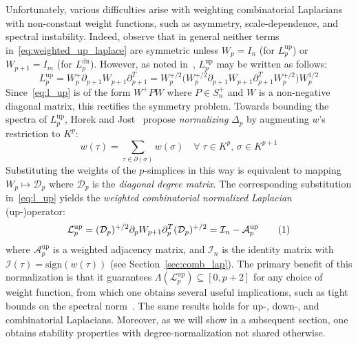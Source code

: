 \documentclass[10pt]{article}
\numberwithin{equation}{section}
\newcommand{\+}{%
	\raisebox{0.18ex}{\scaleobj{0.55}{+}}
}
\theoremstyle{definition}
\theoremstyle{definition}
\newcommand\numberthis{\addtocounter{equation}{1}\tag{\theequation}}
\begin{document}
Unfortunately, various difficulties arise with weighting combinatorial Laplacians with non-constant weight functions, such as asymmetry, scale-dependence, and spectral instability.
Indeed, observe that in general neither terms in~\eqref{eq:weighted_up_laplace} are symmetric unless $W_p = I_n$ (for $L_p^{\text{up}}$) or $W_{p+1} = I_m$ (for $L_p^{\text{dn}}$). 
However, as noted in~\cite{memoli2022persistent}, $L_p^{\text{up}}$ may be written as follows: 
\begin{equation}\label{eq:l_up}
	L_p^{\text{up}} = W_p^{+} \partial_{p+1} W_{p+1} \partial_{p+1}^T  = W_p^{+/2} \big( W_p^{+/2}  \partial_{p+1} W_{p+1} \partial_{p+1}^T W_p^{+/2}  \big ) W_p^{1/2} 
\end{equation}
Since~\eqref{eq:l_up} is of the form $W^{+} P W$ where $P \in S_n^+$ and $W$ is a non-negative diagonal matrix, this rectifies the symmetry problem.
Towards bounding the spectra of $L_p^{\text{up}}$, Horek and Jost~\cite{} propose \emph{normalizing} $\Delta_p$ by augmenting $w$'s restriction to $K^p$: 
\begin{equation}
	w(\tau) = \sum\limits_{\tau \in \partial(\sigma) }w(\sigma) \quad \forall \; \tau \in K^{p}, \, \sigma \in K^{p+1}
\end{equation}
Substituting the weights of the $p$-simplices in this way is equivalent to mapping $W_p \mapsto \mathcal{D}_p$ where $\mathcal{D}_p$ is the \emph{diagonal degree matrix}. The corresponding substitution in~\eqref{eq:l_up} yields the \emph{weighted combinatorial normalized Laplacian} (up-)operator:
\begin{align*}\label{eq:normalized_up_lap}
	 \mathcal{L}_p^{\text{up}} = (\mathcal{D}_p)^{+/2} \partial_p W_{p+1} \partial_p^T (\mathcal{D}_p)^{+/2} = \mathcal{I}_n - \mathcal{A}_p^{\text{up}} \numberthis
\end{align*}
where $\mathcal{A}_p^{\text{up}}$ is a weighted adjacency matrix, and $\mathcal{I}_n$ is the identity matrix with $\mathcal{I}(\tau) = \mathrm{sign}(w(\tau))$ (see Section~\ref{sec:comb_lap}). The primary benefit of this normalization is that it guarantees $\Lambda( \mathcal{L}_p^{\text{up}}) \subseteq [0,p+2]$ for any choice of weight function, from which one obtains several useful implications, such as tight bounds on the spectral norm~\cite{}. 
The same results holds for up-, down-, and combinatorial Laplacians.
Moreover, as we will show in a subsequent section, one obtains stability properties with degree-normalization not shared otherwise. 
\end{document}
